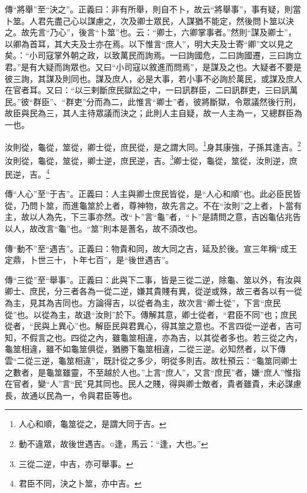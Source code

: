 {\noindent\zhuan{}\fzbyks 傳“將舉”至“決之”。正義曰：非有所舉，則自不卜，故云“將舉事”，事有疑，則當卜筮。人君先盡己心以謀慮之，次及卿士眾民，人謀猶不能定，然後問卜筮以決之。故先言“乃心”，後言“卜筮”也。云：“卿士，六卿掌事者。”然則“謀及卿士”，以卿為首耳，其大夫及士亦在焉。以下惟言“庶人”，明大夫及士寄“卿”文以見之矣。：“小司寇掌外朝之政，以致萬民而詢焉。一曰詢國危，二曰詢國遷，三曰詢立君。”是有大疑而詢眾也。又曰“小司寇以敘進而問焉”，是謀及之也。大疑者不要是彼三詢，其謀及則同也。謀及庶人，必是大事，若小事不必詢於萬民，或謀及庶人在官者耳。又曰：“以三剌斷庶民獄訟之中，一曰訊群臣，二曰訊群吏，三曰訊萬民。”彼“群臣”、“群吏”分而為二，此惟言“卿士”者，彼將斷獄，令眾議然後行刑，故臣與民為三，其人主待眾議而決之；此則人主自疑，故一人主為一，又總群臣為一也。 \par}

汝則從，龜從，筮從，卿士從，庶民從，是之謂大同。\footnote{人心和順，龜筮從之，是謂大同于吉。}身其康強，子孫其逢吉。\footnote{動不違眾，故後世遇吉。○逢，馬云：“逢，大也。”}汝則從，龜從，筮從，卿士逆，庶民逆，吉。\footnote{三從二逆，中吉，亦可舉事。}卿士從，龜從，筮從，汝則逆，庶民逆，吉。\footnote{君臣不同，決之卜筮，亦中吉。}


{\noindent\zhuan{}\fzbyks 傳“人心”至“于吉”。正義曰：人主與卿士庶民皆從，是“人心和順”也。此必臣民皆從，乃問卜筮，而進龜筮於上者，尊神物，故先言之。不在“汝則”之上者，卜當有主，故以人為先，下三事亦然。改“卜”言“龜”者，“卜”是請問之意，吉凶龜佔兆告以人，故改言“龜”也。“筮”則本是蓍名，故不須改也。 \par}

{\noindent\zhuan{}\fzbyks 傳“動不”至“遇吉”。正義曰：物貴和同，故大同之吉，延及於後。宣三年稱“成王定鼎，卜世三十，卜年七百”，是“後世遇吉”。 \par}

{\noindent\zhuan{}\fzbyks 傳“三從”至“舉事”。正義曰：此與下二事，皆是三從二逆，除龜、筮以外，有汝與卿士、庶民，分三者各為一從二逆，嫌其貴賤有異，從逆或殊，故三者各以有一從為主，見其為吉同也。方論得吉，以從者為主，故次言“卿士從”，下言“庶民從”也。以從為主，故退“汝則”於下。傳解其意，卿士從者，“君臣不同”也；庶民從者，“民與上異心”也。解臣民與君異心，得其筮之意也。不言四從一逆者，吉可知，不假言之也。四從之內，雖龜筮相違，亦為吉，以其從者多也。若三從之內，龜筮相違，雖不如龜筮俱從，猶勝下龜筮相違，二從三逆。必知然者，以下傳雲“二從三逆，龜筮相違”，既計從之多少，明從多則吉。故杜預云：“龜筮同卿士之數者，是龜筮雖靈，不至越於人也。”上言“庶人”，又言“庶民”者，嫌“庶人”惟指在官者，變“人”言“民”見其同也。民人之賤，得與卿士敵者，貴者雖貴，未必謀慮長，故通以民為一，令與君臣等也。 \par}

